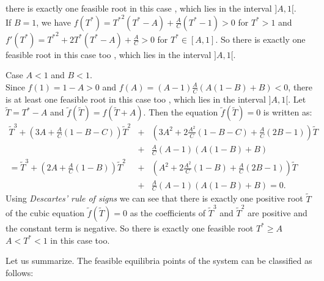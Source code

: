 \documentclass[a4paper, 12pt]{article}
\providecommand{\DIFaddtex}[1]{{\protect\color{blue} \sf #1}} %
\providecommand{\DIFdeltex}[1]{{\protect\color{red} \scriptsize #1}} %
\providecommand{\DIFaddbegin}{} %
\providecommand{\DIFaddend}{} %
\providecommand{\DIFdelbegin}{} %
\providecommand{\DIFdelend}{} %
\providecommand{\DIFadd}[1]{\texorpdfstring{\DIFaddtex{#1}}{#1}} %
\providecommand{\DIFdel}[1]{\texorpdfstring{\DIFdeltex{#1}}{}} %
\begin{document}
\begin{description}
there is exactly one feasible root in this case\DIFaddbegin \DIFadd{, which lies in the interval $]A, 1[$}\DIFaddend .\\
If $B=1$, we have $f(T^*)={T^*}^2(T^*-A)+\frac{A}{C}(T^*-1)>0$ for $T^*>1$ and $f'(T^*)={T^*}^2+2{T^*}({T^*}-A)+\frac{A}{C}>0$ for $T^* \in [A,1]$. 
So there is exactly one feasible root in this case too\DIFaddbegin \DIFadd{, which lies in the interval $]A,1[$}\DIFaddend .
\item[-] Case $A < 1$ and $B < 1$.\\
Since $f(1)=1-A>0$ and $f(A)=(A-1)\frac{A}{C}(A(1-B)+B)<0$, there is at least one feasible root in this case too\DIFaddbegin \DIFadd{, which lies in the interval $]A,1[$}\DIFaddend .
Let $\tilde{T}=T^*-A$ and $\tilde{f}(\tilde{T})=f(\tilde{T}+A)$. Then the equation $\tilde{f}(\tilde{T})=0$ is written as:
\begin{eqnarray*}
\tilde{T}^3 +\left(3A+\frac{A}{C}(1-B-C)\right)\tilde{T}^2&+&\left(3A^2+2\frac{A^2}{C}(1-B-C)+\frac{A}{C}(2B-1)\right)\tilde{T}\\
&+&\frac{A}{C}(A-1)\left(A(1-B)+B\right)\\
    =\tilde{T}^3+\left(2A+\frac{A}{C}(1-B)\right)\tilde{T}^2&+&\left(A^2+2\frac{A^2}{C}(1-B)+\frac{A}{C}(2B-1)\right)\tilde{T}\\
    &+&\frac{A}{C}(A-1)\left(A(1-B)+B\right)=0.
    \end{eqnarray*}
    Using \textsl{Descartes' rule of signs} we can see that there is exactly one positive root $\tilde{T}$ 
    of the cubic equation $\tilde{f}(\tilde{T})=0$  as the coefficients of $\tilde{T}^3$ and $\tilde{T}^2$ are positive and the constant term is negative. 
    So there is exactly one feasible root \DIFdelbegin \DIFdel{$T^*\geq A$ }\DIFdelend \DIFaddbegin \DIFadd{$A<T^*<1$ }\DIFaddend in this case too.
\end{description}
\par\noindent Let us summarize. The feasible equilibria points of the system can be classified as follows:
\end{document}
